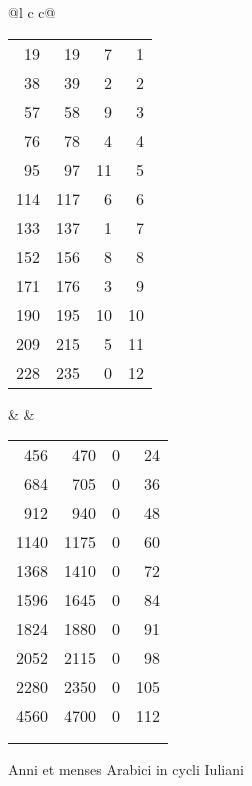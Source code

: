 %
\begin{tabnums} %
\normalsize
\centering
\setlength{\tabcolsep}{2.1pt}
\renewcommand{\arraystretch}{1.008} %
\newcommand{\hts}{\footnotesize}
%
\newcommand{\hdrs}{%
 \ch{\hts Iuliani}{\hts{Cycli Iuliani}} &
 \ch{\hts Arabici}{\hts{Anni Arabici}} &
 \ch{\hts Menses}{\hts{Menses Arabici}} &
 \ch{\hts Numerus}{\hts{Numerus cyclorum}}
}
\begin{tabular}{@{}l c c@{}}
\toprule

\begin{tabular}{@{}r r r r}
\hdrs
\\
\midrule
   19 &   19 &  7 &   1 \\
   38 &   39 &  2 &   2 \\
   57 &   58 &  9 &   3 \\
   76 &   78 &  4 &   4 \\
   95 &   97 & 11 &   5 \\
  114 &  117 &  6 &   6 \\
  133 &  137 &  1 &   7 \\
  152 &  156 &  8 &   8 \\
  171 &  176 &  3 &   9 \\
  190 &  195 & 10 &  10 \\
  209 &  215 &  5 &  11 \\
  228 &  235 &  0 &  12 \\
\bottomrule
\end{tabular}
& \hspace*{3ex} &
\begin{tabular}{@{}r r r r}
\hdrs
\\
\midrule
  456 &  470 &  0 &  24 \\
  684 &  705 &  0 &  36 \\
  912 &  940 &  0 &  48 \\
 1140 & 1175 &  0 &  60 \\
 1368 & 1410 &  0 &  72 \\
 1596 & 1645 &  0 &  84 \\
 1824 & 1880 &  0 &  91 \\
 2052 & 2115 &  0 &  98 \\
 2280 & 2350 &  0 & 105 \\
 4560 & 4700 &  0 & 112 \\
\bottomrule
 \\
 \\
\end{tabular}
\end{tabular}
%
\caption{Anni et menses Arabici in cycli Iuliani}
\label{tab:p121}
\end{tabnums}
